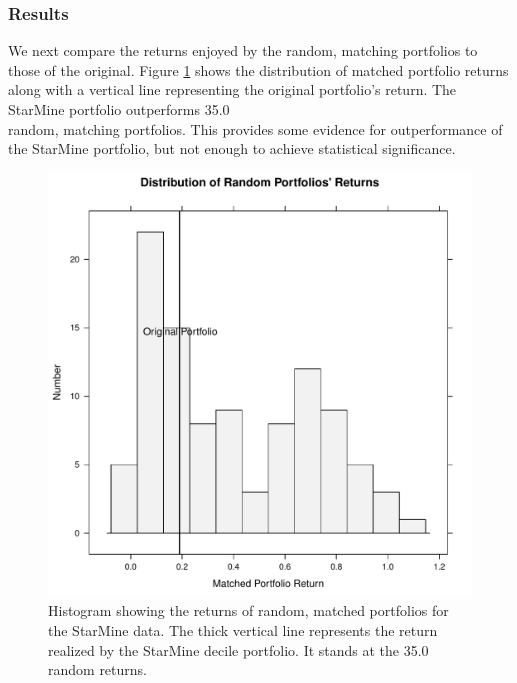 \documentclass{article}\usepackage{graphicx, color}
\makeatletter
\def\maxwidth{ %
  \ifdim\Gin@nat@width>\linewidth
    \linewidth
  \else
    \Gin@nat@width
  \fi
}
\newenvironment{knitrout}{}{} %
\makeatother
\begin{document}
\subsubsection{Results}




We next compare the returns enjoyed by the random, matching portfolios
to those of the original. Figure \ref{FigureRandomPortfolio} shows the
distribution of matched portfolio returns along with a vertical line
representing the original portfolio's return. The StarMine portfolio
outperforms 35.0\\%
random, matching portfolios. This provides some evidence for
outperformance of the StarMine portfolio, but not enough to achieve
statistical significance.

\begin{figure}
\begin{center}
\begin{knitrout}
\color{fgcolor}
\includegraphics[width=\maxwidth]{figure/unnamed-chunk-15} 

\end{knitrout}

\caption{Histogram showing the returns of random, matched portfolios
  for the StarMine data. The thick vertical line represents the return
  realized by the StarMine decile portfolio. It stands at the
  35.0\\%
  random returns.}
\label{FigureRandomPortfolio}
\end{center}
\end{figure}
\end{document}

